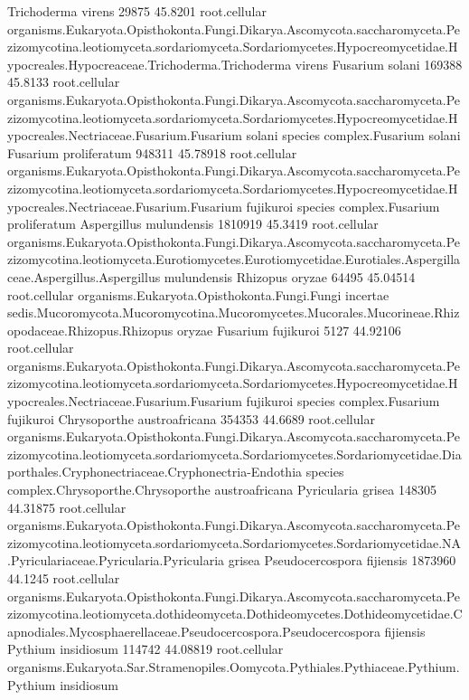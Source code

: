 \documentclass{article}
\begin{document}
\begin{Schunk}
\begin{Soutput}
 Trichoderma virens 		 29875 45.8201 	 root.cellular organisms.Eukaryota.Opisthokonta.Fungi.Dikarya.Ascomycota.saccharomyceta.Pezizomycotina.leotiomyceta.sordariomyceta.Sordariomycetes.Hypocreomycetidae.Hypocreales.Hypocreaceae.Trichoderma.Trichoderma virens
 Fusarium solani 		 169388 45.8133 	 root.cellular organisms.Eukaryota.Opisthokonta.Fungi.Dikarya.Ascomycota.saccharomyceta.Pezizomycotina.leotiomyceta.sordariomyceta.Sordariomycetes.Hypocreomycetidae.Hypocreales.Nectriaceae.Fusarium.Fusarium solani species complex.Fusarium solani
 Fusarium proliferatum 		 948311 45.78918 	 root.cellular organisms.Eukaryota.Opisthokonta.Fungi.Dikarya.Ascomycota.saccharomyceta.Pezizomycotina.leotiomyceta.sordariomyceta.Sordariomycetes.Hypocreomycetidae.Hypocreales.Nectriaceae.Fusarium.Fusarium fujikuroi species complex.Fusarium proliferatum
 Aspergillus mulundensis 		 1810919 45.3419 	 root.cellular organisms.Eukaryota.Opisthokonta.Fungi.Dikarya.Ascomycota.saccharomyceta.Pezizomycotina.leotiomyceta.Eurotiomycetes.Eurotiomycetidae.Eurotiales.Aspergillaceae.Aspergillus.Aspergillus mulundensis
 Rhizopus oryzae 		 64495 45.04514 	 root.cellular organisms.Eukaryota.Opisthokonta.Fungi.Fungi incertae sedis.Mucoromycota.Mucoromycotina.Mucoromycetes.Mucorales.Mucorineae.Rhizopodaceae.Rhizopus.Rhizopus oryzae
 Fusarium fujikuroi 		 5127 44.92106 	 root.cellular organisms.Eukaryota.Opisthokonta.Fungi.Dikarya.Ascomycota.saccharomyceta.Pezizomycotina.leotiomyceta.sordariomyceta.Sordariomycetes.Hypocreomycetidae.Hypocreales.Nectriaceae.Fusarium.Fusarium fujikuroi species complex.Fusarium fujikuroi
 Chrysoporthe austroafricana 		 354353 44.6689 	 root.cellular organisms.Eukaryota.Opisthokonta.Fungi.Dikarya.Ascomycota.saccharomyceta.Pezizomycotina.leotiomyceta.sordariomyceta.Sordariomycetes.Sordariomycetidae.Diaporthales.Cryphonectriaceae.Cryphonectria-Endothia species complex.Chrysoporthe.Chrysoporthe austroafricana
 Pyricularia grisea 		 148305 44.31875 	 root.cellular organisms.Eukaryota.Opisthokonta.Fungi.Dikarya.Ascomycota.saccharomyceta.Pezizomycotina.leotiomyceta.sordariomyceta.Sordariomycetes.Sordariomycetidae.NA.Pyriculariaceae.Pyricularia.Pyricularia grisea
 Pseudocercospora fijiensis 		 1873960 44.1245 	 root.cellular organisms.Eukaryota.Opisthokonta.Fungi.Dikarya.Ascomycota.saccharomyceta.Pezizomycotina.leotiomyceta.dothideomyceta.Dothideomycetes.Dothideomycetidae.Capnodiales.Mycosphaerellaceae.Pseudocercospora.Pseudocercospora fijiensis
 Pythium insidiosum 		 114742 44.08819 	 root.cellular organisms.Eukaryota.Sar.Stramenopiles.Oomycota.Pythiales.Pythiaceae.Pythium.Pythium insidiosum

\end{Soutput}
\end{Schunk}
\end{document}
